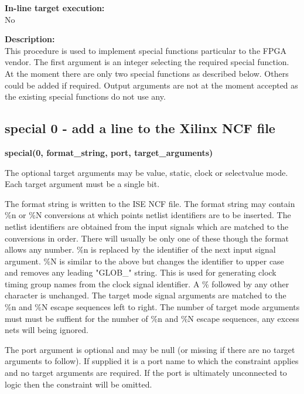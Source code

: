         {\bf In-line target execution:} \\
        No
        
        {\bf Description:} \\
        This procedure is used to implement special functions particular to the
        FPGA vendor. The first argument is an integer selecting the required
        special function. At the moment there are only two special functions
        as described below. Others could be added if required. Output arguments
        are not at the moment accepted as the existing special functions do
        not use any.

        \subsection{special 0 - add a line to the Xilinx NCF file}

            {\bf special(0, format\_string, port, target\_arguments)}
            
            The optional target arguments may be value, static, clock or
            selectvalue mode. Each target argument must be a single bit.
            
            The format string is written to the ISE NCF file. The format string
            may contain \%n or \%N conversions at which points netlist
            identifiers are to be inserted. The netlist identifiers are obtained
            from the input signals which are matched to the conversions in
            order. There will usually be only one of these though the format
            allows any number. \%n is replaced by the identifier of the next
            input signal argument. \%N is similar to the above but changes the
            identifier to upper case and removes any leading "GLOB\_" string.
            This is used for generating clock timing group names from the clock
            signal identifier. A \% followed by any other character is
            unchanged. The target mode signal arguments are matched to the \%n
            and \%N escape sequences left to right. The number of target mode
            arguments must must be suffient for the number of \%n and \%N escape
            sequences, any excess nets will being ignored.
            
            The port argument is optional and may be null (or missing if there
            are no target arguments to follow). If supplied it is a port name
            to which the constraint applies and no target arguments are required.
            If the port is ultimately unconnected to logic then the constraint
            will be omitted.
            
